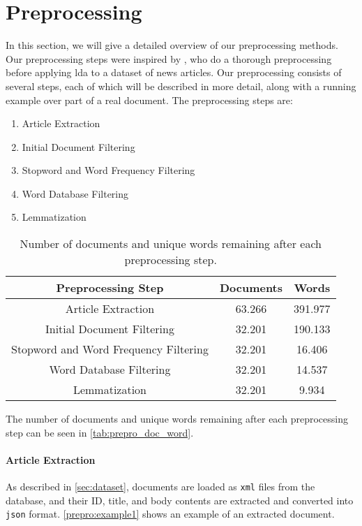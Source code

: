 \section{Preprocessing}\label{sec:prepro}

In this section, we will give a detailed overview of our preprocessing methods.
Our preprocessing steps were inspired by \cite{quanti}, who do a thorough preprocessing before applying \gls{lda} to a dataset of news articles. 
Our preprocessing consists of several steps, each of which will be described in more detail, along with a running example over part of a real document.
The preprocessing steps are:
\begin{enumerate}[label=\alph*)]
	\item Article Extraction
	\item Initial Document Filtering
	\item Stopword and Word Frequency Filtering
	\item Word Database Filtering
	\item Lemmatization 
\end{enumerate}

\begin{table}[b]
	\caption{Number of documents and unique words remaining after each preprocessing step.}
	\begin{tabular}{c|c|c}
		Preprocessing Step & Documents & Words\\
		\hline
		Article Extraction & 63.266 & 391.977 \\ 
		Initial Document Filtering & 32.201 & 190.133 \\ 
		Stopword and Word Frequency Filtering & 32.201 & 16.406 \\
		Word Database Filtering & 32.201 & 14.537 \\
		Lemmatization & 32.201 & 9.934\\
	\end{tabular}
	\label{tab:prepro_doc_word}
\end{table}

The number of documents and unique words remaining after each preprocessing step can be seen in \autoref{tab:prepro_doc_word}.

\paragraph{Article Extraction}
As described in \autoref{sec:dataset}, documents are loaded as \texttt{xml} files from the database, and their ID, title, and body contents are extracted and converted into \texttt{json} format.
\autoref{prepro:example1} shows an example of an extracted document.

